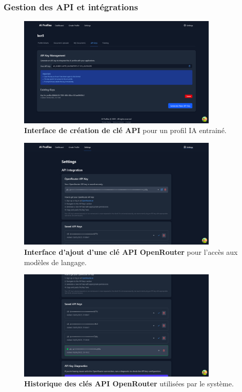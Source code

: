 \subsubsection{Gestion des API et intégrations}

\begin{figure}[H]
  \centering
  \includegraphics[width=0.85\textwidth,keepaspectratio]{pfe-pics/ai-profile-creation/create_and_api_key_for_trained_profile.png}
  \caption{\textbf{Interface de création de clé API} pour un profil IA entrainé.}
  \label{fig:api_key_creation}
\end{figure}

\begin{figure}[H]
  \centering
  \includegraphics[width=0.85\textwidth,keepaspectratio]{pfe-pics/ai-profile-creation/adding_openRouter_api.png}
  \caption{\textbf{Interface d'ajout d'une clé API OpenRouter} pour l'accès aux modèles de langage.}
  \label{fig:openrouter_api_addition}
\end{figure}

\begin{figure}[H]
  \centering
  \includegraphics[width=0.85\textwidth,keepaspectratio]{pfe-pics/ai-profile-creation/oneRouter_keys_hestory.png}
  \caption{\textbf{Historique des clés API OpenRouter} utilisées par le système.}
  \label{fig:api_keys_history}
\end{figure}

